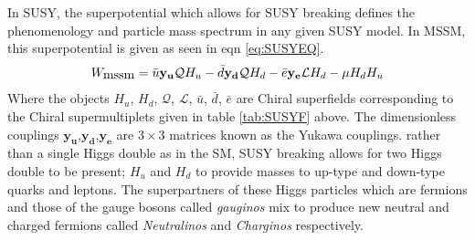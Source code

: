 In SUSY, the superpotential which allows for SUSY breaking defines the phenomenology and particle mass spectrum in any given SUSY model.
In MSSM, this superpotential is given as seen in eqn \ref{eq:SUSYEQ}.
\begin{align}{\label{eq:SUSYEQ}}
W_{\mbox{mssm}} = \bar{u}\mathbf{y_{u}}\mathcal{Q}H_{u}   -   \bar{d}\mathbf{y_{d}}\mathcal{Q}H_{d}   -  \bar{e}\mathbf{y_{e}}\mathcal{L}H_{d}  -  \mu H_{d}H_{u}
\end{align}
Where the objects $H_{u}$, $H_{d}$, $\mathcal{Q}$, $\mathcal{L}$, $\bar{u}$, $\bar{d}$, $\bar{e}$ are Chiral superfields corresponding to the Chiral supermultiplets given in table \ref{tab:SUSYF} above.
The dimensionless couplings $\mathbf{y_{u}}$,$\mathbf{y_{d}}$,$\mathbf{y_{e}}$ are $3 \times 3$ matrices known as the Yukawa couplings. rather than a single Higgs double as in  the SM, SUSY breaking allows for two Higgs double to be present; $H_{u}$ and $H_{d}$ to provide masses to \textsf{up}-type and \textsf{down}-type quarks and leptons. The superpartners of these Higgs particles which are fermions and those of the gauge bosons called \textit{gauginos} mix to produce new neutral and charged fermions called \textit{Neutralinos} and \textit{Charginos} respectively.
